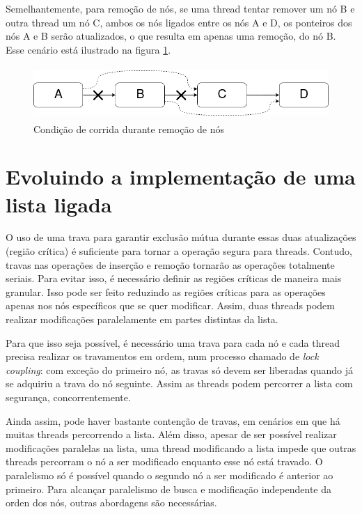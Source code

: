 \documentclass[a4paper,12pt,oldfontcommands]{abntex2}
\begin{document}
Semelhantemente, para remoção de nós, se uma thread tentar remover um nó B e outra thread um nó C, ambos os nós ligados entre os nós A e D, os ponteiros dos nós A e B serão atualizados, o que resulta em apenas uma remoção, do nó B. Esse cenário está ilustrado na figura \ref{figure-contention-removal}.

\begin{figure}[htbp]
    \centering
    \includegraphics[height=2cm]{img/contetion-removal}
    \caption{Condição de corrida durante remoção de nós}
    \label{figure-contention-removal}
\end{figure}

\section{Evoluindo a implementação de uma lista ligada}\label{section-impl-evolution}

O uso de uma trava para garantir exclusão mútua durante essas duas atualizações (região crítica) é suficiente para tornar a operação segura para threads. Contudo, travas nas operações de inserção e remoção tornarão as operações totalmente seriais. Para evitar isso, é necessário definir as regiões críticas de maneira mais granular. Isso pode ser feito reduzindo as regiões críticas para as operações apenas nos nós específicos que se quer modificar. Assim, duas threads podem realizar modificações paralelamente em partes distintas da lista.

Para que isso seja possível, é necessário uma trava para cada nó e cada thread precisa realizar os travamentos em ordem, num processo chamado de \textit{lock coupling}: com exceção do primeiro nó, as travas só devem ser liberadas quando já se adquiriu a trava do nó seguinte. Assim as threads podem percorrer a lista com segurança, concorrentemente.

Ainda assim, pode haver bastante contenção de travas, em cenários em que há muitas threads percorrendo a lista. Além disso, apesar de ser possível realizar modificações paralelas na lista, uma thread modificando a lista impede que outras threads percorram o nó a ser modificado enquanto esse nó está travado. O paralelismo só é possível quando o segundo nó a ser modificado é anterior ao primeiro. Para alcançar paralelismo de busca e modificação independente da orden dos nós, outras abordagens são necessárias.
\end{document}
